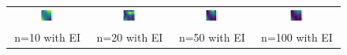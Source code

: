 \documentclass[11pt]{article}
\begin{document}
\begin{figure}[H]
    \centering
    \begin{tabular}{cccc}
        \includegraphics[width=0.225\textwidth]{../Task-02/plots/gp_mean_rbf_n10_EI.png} &
        \includegraphics[width=0.225\textwidth]{../Task-02/plots/gp_mean_rbf_n20_EI.png} &
        \includegraphics[width=0.225\textwidth]{../Task-02/plots/gp_mean_rbf_n50_EI.png} &
        \includegraphics[width=0.225\textwidth]{../Task-02/plots/gp_mean_rbf_n100_EI.png} \\
        n=10 with EI & n=20 with EI & n=50 with EI & n=100 with EI \\[0.5em]
        

\end{tabular}
\end{figure}
\end{document}
